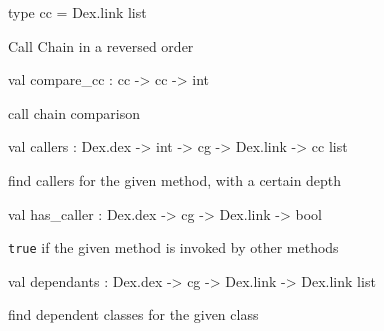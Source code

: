 \documentclass[11pt]{article}
\begin{document}
\label{type:Callgraph.cc}\begin{ocamldoccode}
type cc = Dex.link list 
\end{ocamldoccode}
\begin{ocamldocdescription}
Call Chain in a reversed order


\end{ocamldocdescription}




\label{val:Callgraph.compare-underscorecc}\begin{ocamldoccode}
val compare_cc : cc -> cc -> int
\end{ocamldoccode}
\begin{ocamldocdescription}
call chain comparison


\end{ocamldocdescription}




\label{val:Callgraph.callers}\begin{ocamldoccode}
val callers : Dex.dex -> int -> cg -> Dex.link -> cc list
\end{ocamldoccode}
\begin{ocamldocdescription}
find callers for the given method, with a certain depth


\end{ocamldocdescription}




\label{val:Callgraph.has-underscorecaller}\begin{ocamldoccode}
val has_caller : Dex.dex -> cg -> Dex.link -> bool
\end{ocamldoccode}
\begin{ocamldocdescription}
{\tt{true}} if the given method is invoked by other methods


\end{ocamldocdescription}




\label{val:Callgraph.dependants}\begin{ocamldoccode}
val dependants : Dex.dex -> cg -> Dex.link -> Dex.link list
\end{ocamldoccode}
\begin{ocamldocdescription}
find dependent classes for the given class


\end{ocamldocdescription}
\end{document}
